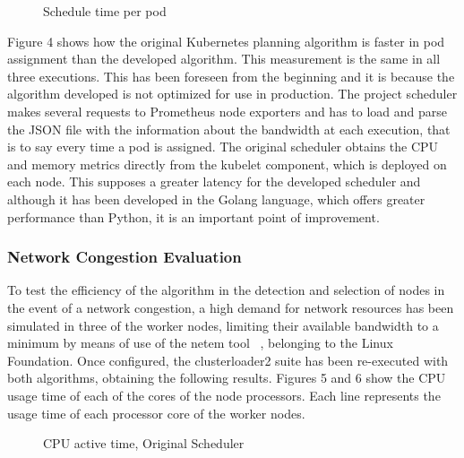 \documentclass[conference]{IEEEtran}
\begin{document}
\begin{figure}[h]
\begin{center}
\strut{}
\caption{Schedule time per pod}\label{fig:cluster}
\end{center}
\end{figure}

Figure 4 shows how the original Kubernetes planning algorithm is faster in pod assignment than the developed algorithm. This measurement is the same in all three executions. This has been foreseen from 
the beginning and it is because the algorithm developed is not optimized for use in production. The project scheduler makes several requests to Prometheus node exporters and has to load and parse the JSON 
file with the information about the bandwidth at each execution, that is to say every time a pod is assigned. The original scheduler obtains the CPU and memory metrics directly from the kubelet component, 
which is deployed on each node. This supposes a greater latency for the developed scheduler and although it has been developed in the Golang language, which offers greater performance than Python, it is an 
important point of improvement.

\subsubsection{Network Congestion Evaluation}\label{sec:netcongest}

To test the efficiency of the algorithm in the detection and selection of nodes in the event of a network congestion, a high demand for network resources has been simulated in three of the worker nodes, 
limiting their available bandwidth to a minimum by means of use of the netem tool ~\cite{netem}, belonging to the Linux Foundation. Once configured, the clusterloader2 suite has been re-executed with both 
algorithms, obtaining the following results. Figures 5 and 6 show the CPU usage time of each of the cores of the node processors. Each line represents the usage time of each processor core of the worker 
nodes.

\begin{figure}[t]
\begin{center}
\strut{}
\caption{CPU active time, Original Scheduler}\label{fig:cluster}
\end{center}
\end{figure}
\end{document}
